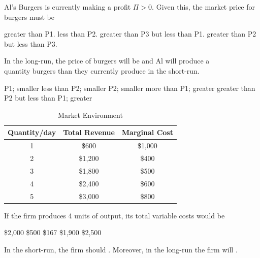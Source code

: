 \documentclass[addpoints,11pt]{exam}
\theoremstyle{definition}
\newcommand{\blank}[0]{\underline{\hspace{3cm}}}
\begin{document}
\begin{questions}
\question \label{q3} Al's Burgers is currently making a profit $\Pi > 0$. Given this, the market price for burgers must be

	\begin{choices}
		\CorrectChoice greater than P1.
		\choice less than P2.
		\choice greater than P3 but less than P1.
		\choice greater than P2 but less than P3.
	\end{choices}



\question \label{q4} In the long-run, the price of burgers will be \blank and Al will produce a \blank\\ quantity burgers than they currently produce in the short-run. 

	\begin{choices}
	\CorrectChoice P1; smaller
	\choice less than P2; smaller
	\choice P2; smaller
	\choice more than P1; greater
	\choice greater than P2 but less than P1; greater
\end{choices}
	

\begin{table}[H]
	\caption{Market Environment}
	\centering
	\begin{tabular}{c|c|c} 
		
		Quantity/day   & Total Revenue &  Marginal Cost \\
		\hline
		1 & \$600 &  \$1,000 \\
		2 & \$1,200 & \$400 \\
		3 & \$1,800 & \$500 \\
		4 & \$2,400 & \$600 \\
		5  & \$3,000 & \$800 \\
	\end{tabular}
	\label{SA3}
\end{table}

\newpage

\question \label{q5} If the firm produces 4 units of output, its total variable costs would be

\begin{choices}
	\choice \$2,000
	\choice \$500
	\choice \$167
	\choice \$1,900
	\CorrectChoice \$2,500
\end{choices}

\question \label{q6} In the short-run, the firm should \blank. Moreover, in the long-run the firm will \blank.


\end{questions}
\end{document}

